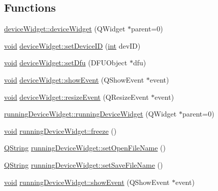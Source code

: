 \subsection*{Functions}
\begin{DoxyCompactItemize}
\item 
\hyperlink{group___y_modem_uploader_gafcee9273f2b8216d324c235d5e164899}{device\-Widget\-::device\-Widget} (Q\-Widget $\ast$parent=0)
\item 
\hyperlink{group___u_a_v_objects_plugin_ga444cf2ff3f0ecbe028adce838d373f5c}{void} \hyperlink{group___y_modem_uploader_ga9b64e94e398f8362d8dcae0b9ec4275f}{device\-Widget\-::set\-Device\-I\-D} (\hyperlink{ioapi_8h_a787fa3cf048117ba7123753c1e74fcd6}{int} dev\-I\-D)
\item 
\hyperlink{group___u_a_v_objects_plugin_ga444cf2ff3f0ecbe028adce838d373f5c}{void} \hyperlink{group___y_modem_uploader_gadc475267f79d2e50ec5eac4f043aa058}{device\-Widget\-::set\-Dfu} (D\-F\-U\-Object $\ast$dfu)
\item 
\hyperlink{group___u_a_v_objects_plugin_ga444cf2ff3f0ecbe028adce838d373f5c}{void} \hyperlink{group___y_modem_uploader_gae8c02916851ec8e041d9e2fb1be90a91}{device\-Widget\-::show\-Event} (Q\-Show\-Event $\ast$event)
\item 
\hyperlink{group___u_a_v_objects_plugin_ga444cf2ff3f0ecbe028adce838d373f5c}{void} \hyperlink{group___y_modem_uploader_ga732d883048a75c6bac92c02fe90f2184}{device\-Widget\-::resize\-Event} (Q\-Resize\-Event $\ast$event)
\item 
\hyperlink{group___y_modem_uploader_ga768545e1c1edb88b0a2b2d87b8c02202}{running\-Device\-Widget\-::running\-Device\-Widget} (Q\-Widget $\ast$parent=0)
\item 
\hyperlink{group___u_a_v_objects_plugin_ga444cf2ff3f0ecbe028adce838d373f5c}{void} \hyperlink{group___y_modem_uploader_gabdf38e4bfbb45785ce938043aed76fc9}{running\-Device\-Widget\-::freeze} ()
\item 
\hyperlink{group___u_a_v_objects_plugin_gab9d252f49c333c94a72f97ce3105a32d}{Q\-String} \hyperlink{group___y_modem_uploader_gafa1350e74a2173b31997cb6662dc4fee}{running\-Device\-Widget\-::set\-Open\-File\-Name} ()
\item 
\hyperlink{group___u_a_v_objects_plugin_gab9d252f49c333c94a72f97ce3105a32d}{Q\-String} \hyperlink{group___y_modem_uploader_ga47452d9426396c22a0c0734f2c7a9f51}{running\-Device\-Widget\-::set\-Save\-File\-Name} ()
\item 
\hyperlink{group___u_a_v_objects_plugin_ga444cf2ff3f0ecbe028adce838d373f5c}{void} \hyperlink{group___y_modem_uploader_ga11be8942ae8b277f63d85dcb7c1449a4}{running\-Device\-Widget\-::show\-Event} (Q\-Show\-Event $\ast$event)

\end{DoxyCompactItemize}
